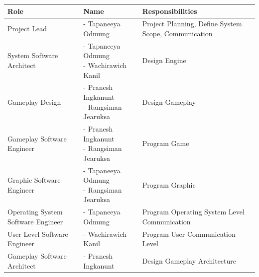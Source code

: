 \begin{minipage}{\textwidth}
    \begin{tabularx}{\textwidth}{|L|L|L|}
        \hline
        \textbf{Role} & \textbf{Name} & \textbf{Responsibilities} \\
        \hline
        Project Lead & - Tapaneeya Odmung & Project Planning, Define System Scope, Communication \\
        System Software Architect & {- Tapaneeya Odmung \newline - Wachirawich Kanil} & Design Engine \\
        Gameplay Design & {- Pranesh Ingkanunt \newline - Rangsiman Jearuksa} & Design Gameplay \\
        Gameplay Software Engineer & {- Pranesh Ingkanunt \newline - Rangsiman Jearuksa} & Program Game \\
        Graphic Software Engineer & {- Tapaneeya Odmung \newline - Rangsiman Jearuksa} & Program Graphic \\
        Operating System Software Engineer & - Tapaneeya Odmung & Program Operating System Level Communication \\
        User Level Software Engineer & - Wachirawich Kanil & Program User Communication Level \\
        Gameplay Software Architect & - Pranesh Ingkanunt & Design Gameplay Architecture \\
        \hline
    \end{tabularx}
\end{minipage}
\label{tab:role-name-responsibilities}